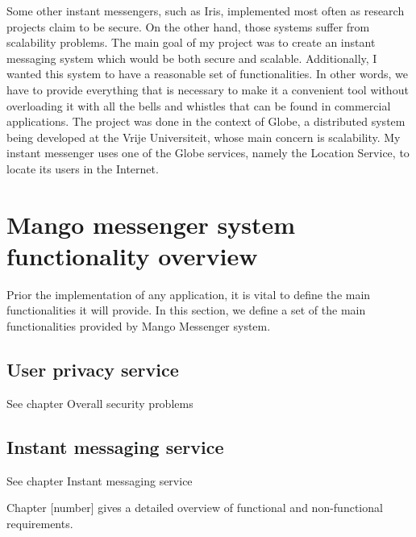 Some other instant messengers, such as Iris, implemented most often as research projects claim to be secure.
On the other hand, those systems suffer from scalability problems.
The main goal of my project was to create an instant messaging system which would be both secure and scalable.
Additionally, I wanted this system to have a reasonable set of functionalities.
In other words, we have to provide everything that is necessary to make it a convenient tool without overloading
it with all the bells and whistles that can be found in commercial applications.
The project was done in the context of Globe, a distributed system being developed at the Vrije Universiteit,
whose main concern is scalability.
My instant messenger uses one of the Globe services, namely the Location Service, to locate its users in the Internet.

\section{Mango messenger system functionality overview}\label{sec:general-im-functionality-overview}
Prior the implementation of any application, it is vital to define the main functionalities it will provide.
In this section, we define a set of the main functionalities provided by Mango Messenger system.

\subsection{User privacy service}\label{subsec:user-privacy-service}

See chapter Overall security problems

\subsection{Instant messaging service}\label{subsec:instant-messaging-service}

See chapter Instant messaging service

Chapter [number] gives a detailed overview of functional and non-functional requirements.

